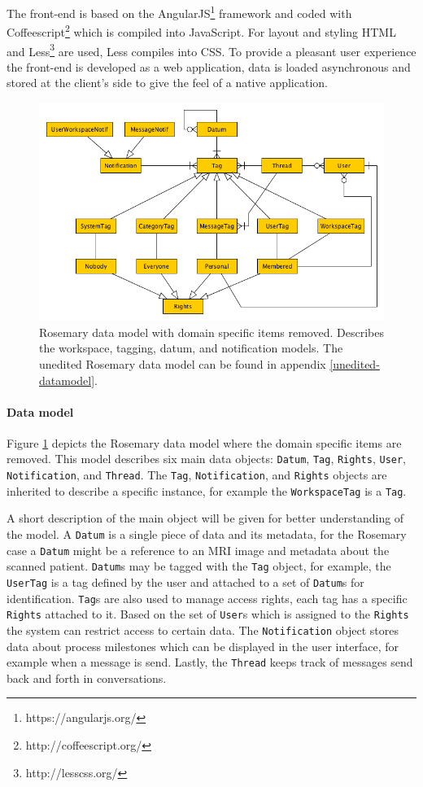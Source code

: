 The front-end is based on the AngularJS\footnote{https://angularjs.org/} framework and coded with Coffeescript\footnote{http://coffeescript.org/} which is compiled into JavaScript.
For layout and styling HTML and Less\footnote{http://lesscss.org/} are used, Less compiles into CSS.
To provide a pleasant user experience the front-end is developed as a web application, data is loaded asynchronous and stored at the client's side to give the feel of a native application.

\begin{figure}[!hb]
	\centering
	\includegraphics[width=1.0\linewidth]{images/datamodel-clean}
	\caption{
		Rosemary data model with domain specific items removed.
		Describes the workspace, tagging, datum, and notification models.
		The unedited Rosemary data model can be found in appendix \ref{unedited-datamodel}.
	}
	\label{fig:reuse-rosemary-dm}
\end{figure}

\paragraph{Data model}
Figure \ref{fig:reuse-rosemary-dm} depicts the Rosemary data model where the domain specific items are removed.
This model describes six main data objects: {\tt Datum}, {\tt Tag}, {\tt Rights}, {\tt User}, {\tt Notification}, and {\tt Thread}.
The {\tt Tag}, {\tt Notification}, and {\tt Rights} objects are inherited to describe a specific instance, for example the {\tt WorkspaceTag} is a {\tt Tag}.

A short description of the main object will be given for better understanding of the model.
A {\tt Datum} is a single piece of data and its metadata, for the Rosemary case a {\tt Datum} might be a reference to an MRI image and metadata about the scanned patient.
{\tt Datum}s may be tagged with the {\tt Tag} object, for example, the {\tt UserTag} is a tag defined by the user and attached to a set of {\tt Datum}s for identification.
{\tt Tag}s are also used to manage access rights, each tag has a specific {\tt Rights} attached to it.
Based on the set of {\tt User}s which is assigned to the {\tt Rights} the system can restrict access to certain data.
The {\tt Notification} object stores data about process milestones which can be displayed in the user interface, for example when a message is send.
Lastly, the {\tt Thread} keeps track of messages send back and forth in conversations.


